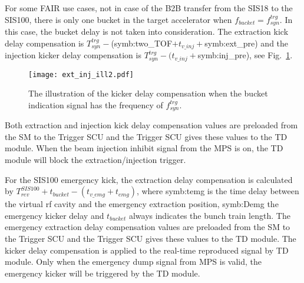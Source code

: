 For some FAIR use cases, not in case of the B2B transfer from the SIS18 to the SIS100, there is only one bucket in the target accelerator when $f_{\mathit{bucket}}=f_{\mathit{syn}}^{\mathit{trg}}$. In this case, the bucket delay is not taken into consideration. The extraction kick delay compensation is $T_{\mathit{syn}}^{\mathit{trg}} -$(\gls{symb:two_TOF}$ + t_{v\_inj}+ $\gls{symb:ext_pre}) and the injection kicker delay compensation is $T_{\mathit{syn}}^{\mathit{trg}} - (t_{v\_inj}+ $\gls{symb:inj_pre}), see Fig.~\ref{ext_inj_kicker1}. 
\begin{figure}[!htb]
   \centering   
   \texttt{[image: ext\_inj\_ill2.pdf]}
   \caption{The illustration of the kicker delay compensation when the bucket indication signal has the frequency of $f_{\mathit{syn}}^{\mathit{trg}}$.}
   \label{ext_inj_kicker1}
\end{figure}



Both extraction and injection kick delay compensation values are preloaded from the SM to the Trigger SCU and the Trigger SCU gives these values to the TD module. When the beam injection inhibit signal from the MPS is on, the TD module will block the extraction/injection trigger.

For the SIS100 emergency kick, the extraction delay compensation is calculated by $T_{\mathit{rev}}^{\mathit{SIS100}} + t_{bucket} - (t_{v\_emg} + t_{emg})$, where \gls{symb:temg} is the time delay between the virtual rf cavity and the emergency extraction position, \gls{symb:Demg} the emergency kicker delay and $t_{bucket}$ always indicates the bunch train length. The emergency extraction delay compensation values are preloaded from the SM to the Trigger SCU and the Trigger SCU gives these values to the TD module. The kicker delay compensation is applied to the real-time reproduced signal by TD module. Only when the emergency dump signal from MPS is valid, the emergency kicker will be triggered by the TD module.


